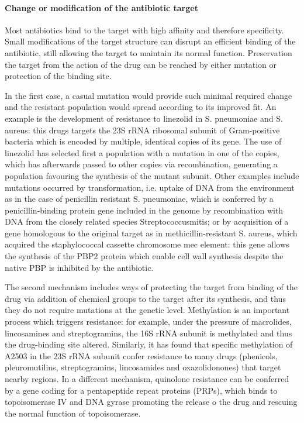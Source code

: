 \documentclass[a4paper,11pt]{extreport}
\begin{document}
\paragraph{Change or modification of the antibiotic target}
Most antibiotics bind to the target with high affinity and therefore specificity. Small modifications of the target structure can disrupt an efficient binding of the antibiotic, still allowing the target to maintain its normal function. Preservation the target from the action of the drug can be reached by either mutation or protection of the binding site.

In the first case, a casual mutation would provide such minimal required change and the resistant population would spread according to its improved fit.
%
An example is the development of resistance to linezolid in S. pneumoniae and S. aureus: this drugs targets the 23S rRNA ribosomal subunit of Gram-positive bacteria which is encoded by multiple, identical copies of its gene. The use of linezolid has selected first a population with a mutation in one of the copies, which has afterwards passed to other copies via recombination, generating a population favouring the synthesis of the mutant subunit.\cite{Billal2011,Gao2010}
%
Other examples include mutations occurred by transformation, i.e. uptake of DNA from the environment as in the case of  penicillin resistant S. pneumoniae, which is conferred by a penicillin-binding protein gene included in the genome by recombination with DNA from the closely related species Streptococcusmitis; or by acquisition of a gene homologous to the original target as in methicillin-resistant S. aureus, which acquired the staphylococcal cassette chromosome mec element\cite{Shore2011}: this gene allows the synthesis of the PBP2 protein which enable cell wall synthesis despite the native PBP is inhibited by the antibiotic.\cite{Katayama2000}

The second mechanism includes ways of protecting the target from binding of the drug via addition of chemical groups to the target after its synthesis, and thus they do not require mutations at the genetic level.
%
Methylation is an important process which triggers resistance: for example, under the pressure of macrolides, lincosamines and streptogramins, the 16S rRNA subunit is methylated and thus the drug-binding site altered.\cite{Kumar2014} Similarly, it has found that specific methylation of A2503 in the 23S rRNA subunit confer resistance to many drugs (phenicols, pleuromutilins, streptogramins, lincosamides and oxazolidonones) that target nearby regions.\cite{Long2006}
%
In a different mechanism, quinolone resistance can be conferred by a gene coding for a pentapeptide repeat proteins (PRPs), which binds to topoisomerase IV and DNA gyrase promoting the release o the drug and rescuing the normal function of topoisomerase.\cite{Vetting2011}
\end{document}
